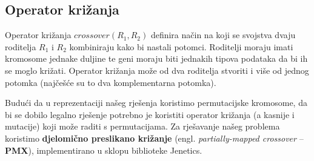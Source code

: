 \documentclass[times, utf8, zavrsni]{fer}
\begin{document}
\subsection{Operator križanja}
Operator križanja $crossover(R_1, R_2)$ definira način na koji se svojstva dvaju roditelja $R_1$ i $R_2$ kombiniraju kako bi nastali potomci. Roditelji moraju imati kromosome jednake duljine te geni moraju biti jednakih tipova podataka da bi ih se moglo križati. Operator križanja može od dva roditelja stvoriti i više od jednog potomka (najčešće su to dva komplementarna potomka).

Budući da u reprezentaciji našeg rješenja koristimo permutacijske kromosome, da bi se dobilo legalno rješenje potrebno je koristiti operator križanja (a kasnije i mutacije) koji može raditi s permutacijama. Za rješavanje našeg problema koristimo \textbf{djelomično preslikano križanje} (engl. \textit{partially-mapped crossover} -- \textbf{PMX}), implementirano u sklopu biblioteke Jenetics.
\end{document}
